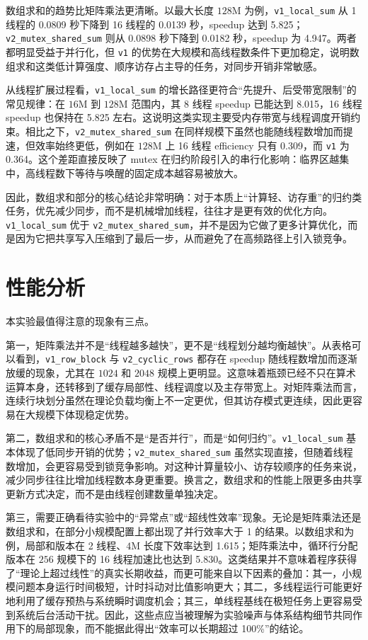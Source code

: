 \documentclass[UTF8,a4paper,12pt,fontset=none]{ctexart}
\begin{document}
数组求和的趋势比矩阵乘法更清晰。以最大长度 \(128\text{M}\) 为例，\texttt{v1\_local\_sum} 从 1 线程的 0.0809 秒下降到 16 线程的 0.0139 秒，speedup 达到 5.825；\texttt{v2\_mutex\_shared\_sum} 则从 0.0898 秒下降到 0.0182 秒，speedup 为 4.947。两者都明显受益于并行化，但 \texttt{v1} 的优势在大规模和高线程数条件下更加稳定，说明数组求和这类低计算强度、顺序访存占主导的任务，对同步开销非常敏感。

从线程扩展过程看，\texttt{v1\_local\_sum} 的增长路径更符合“先提升、后受带宽限制”的常见规律：在 \(16\text{M}\) 到 \(128\text{M}\) 范围内，其 8 线程 speedup 已能达到 8.015，16 线程 speedup 也保持在 5.825 左右。这说明这类实现主要受内存带宽与线程调度开销约束。相比之下，\texttt{v2\_mutex\_shared\_sum} 在同样规模下虽然也能随线程数增加而提速，但效率始终更低，例如在 \(128\text{M}\) 上 16 线程 efficiency 只有 0.309，而 \texttt{v1} 为 0.364。这个差距直接反映了 mutex 在归约阶段引入的串行化影响：临界区越集中，高线程数下等待与唤醒的固定成本越容易被放大。

因此，数组求和部分的核心结论非常明确：对于本质上“计算轻、访存重”的归约类任务，优先减少同步，而不是机械增加线程，往往才是更有效的优化方向。\texttt{v1\_local\_sum} 优于 \texttt{v2\_mutex\_shared\_sum}，并不是因为它做了更多计算优化，而是因为它把共享写入压缩到了最后一步，从而避免了在高频路径上引入锁竞争。

\section{性能分析}

本实验最值得注意的现象有三点。

第一，矩阵乘法并不是“线程越多越快”，更不是“线程划分越均衡越快”。从表格可以看到，\texttt{v1\_row\_block} 与 \texttt{v2\_cyclic\_rows} 都存在 speedup 随线程数增加而逐渐放缓的现象，尤其在 \(1024\) 和 \(2048\) 规模上更明显。这意味着瓶颈已经不只在算术运算本身，还转移到了缓存局部性、线程调度以及主存带宽上。对矩阵乘法而言，连续行块划分虽然在理论负载均衡上不一定更优，但其访存模式更连续，因此更容易在大规模下体现稳定优势。

第二，数组求和的核心矛盾不是“是否并行”，而是“如何归约”。\texttt{v1\_local\_sum} 基本体现了低同步开销的优势；\texttt{v2\_mutex\_shared\_sum} 虽然实现直接，但随着线程数增加，会更容易受到锁竞争影响。对这种计算量较小、访存较顺序的任务来说，减少同步往往比增加线程数本身更重要。换言之，数组求和的性能上限更多由共享更新方式决定，而不是由线程创建数量单独决定。

第三，需要正确看待实验中的“异常点”或“超线性效率”现象。无论是矩阵乘法还是数组求和，在部分小规模配置上都出现了并行效率大于 1 的结果。以数组求和为例，局部和版本在 2 线程、\(4\text{M}\) 长度下效率达到 1.615；矩阵乘法中，循环行分配版本在 \(256\) 规模下的 16 线程加速比也达到 5.830。这类结果并不意味着程序获得了“理论上超过线性”的真实长期收益，而更可能来自以下因素的叠加：其一，小规模问题本身运行时间极短，计时抖动对比值影响更大；其二，多线程运行可能更好地利用了缓存预热与系统瞬时调度机会；其三，单线程基线在极短任务上更容易受到系统后台活动干扰。因此，这些点应当被理解为实验噪声与体系结构细节共同作用下的局部现象，而不能据此得出“效率可以长期超过 100\%”的结论。
\end{document}
